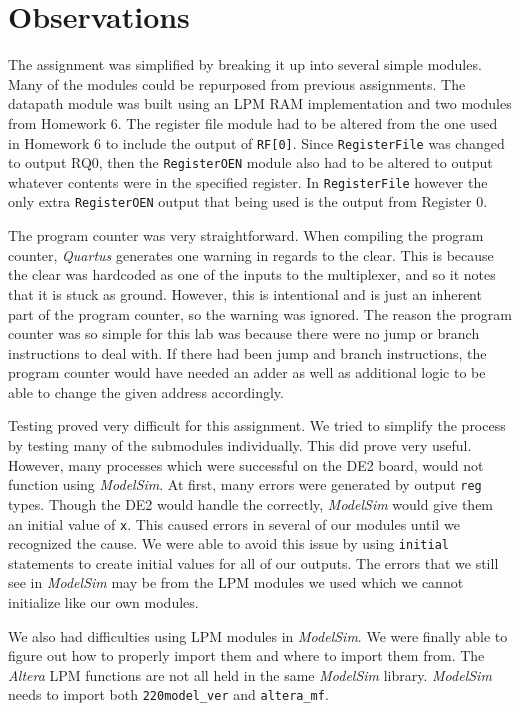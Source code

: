 \section{Observations} %
\label{sec:observations}

The assignment was simplified by breaking it up into several simple modules.
Many of the modules could be repurposed from previous assignments.
The datapath module was built using an LPM RAM implementation and two modules from Homework 6.
The register file module had to be altered from the one used in Homework 6 to include the output of \verb|RF[0]|.
Since \verb|RegisterFile| was changed to output RQ0, then the \verb|RegisterOEN| module also had to be altered to output whatever contents were in the specified register.
In \verb|RegisterFile| however the only extra \verb|RegisterOEN| output that being used is the output from Register 0.

The program counter was very straightforward.
When compiling the program counter, \emph{Quartus} generates one warning in regards to the clear.
This is because the clear was hardcoded as one of the inputs to the multiplexer, and so it notes that it is stuck as ground.
However, this is intentional and is just an inherent part of the program counter, so the warning was ignored.
The reason the program counter was so simple for this lab was because there were no jump or branch instructions to deal with.
If there had been jump and branch instructions, the program counter would have needed an adder as well as additional logic to be able to change the given address accordingly.

Testing proved very difficult for this assignment.
We tried to simplify the process by testing many of the submodules individually.
This did prove very useful.
However, many processes which were successful on the DE2 board, would not function using \emph{ModelSim}.
At first, many errors were generated by output \verb|reg| types.
Though the DE2 would handle the correctly, \emph{ModelSim} would give them an initial value of \verb|x|.
This caused errors in several of our modules until we recognized the cause.
We were able to avoid this issue by using \verb|initial| statements to create initial values for all of our outputs.
The errors that we still see in \emph{ModelSim} may be from the LPM modules we used which we cannot initialize like our own modules.

We also had difficulties using LPM modules in \emph{ModelSim}.
We were finally able to figure out how to properly import them and where to import them from.
The \emph{Altera} LPM functions are not all held in the same \emph{ModelSim} library.
\emph{ModelSim} needs to import both \verb|220model_ver| and \verb|altera_mf|.

